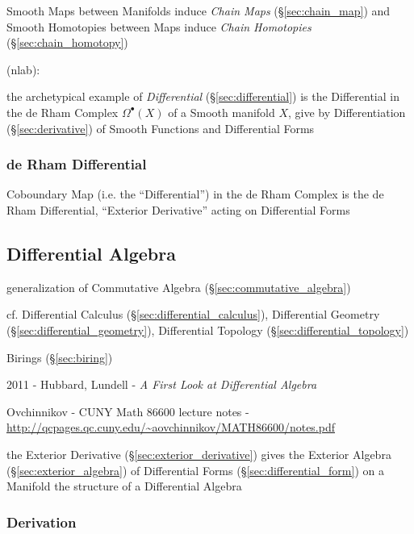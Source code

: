 Smooth Maps between Manifolds induce \emph{Chain Maps} (\S\ref{sec:chain_map})
and Smooth Homotopies between Maps induce \emph{Chain Homotopies}
(\S\ref{sec:chain_homotopy})


(nlab):

the archetypical example of \emph{Differential} (\S\ref{sec:differential}) is
the Differential in the de Rham Complex $\Omega^\bullet(X)$ of a Smooth manifold
$X$, give by Differentiation (\S\ref{sec:derivative}) of Smooth Functions and
Differential Forms



\subsubsection{de Rham Differential}\label{sec:derham_differential}

Coboundary Map (i.e. the ``Differential'') in the de Rham Complex is the de Rham
Differential, ``Exterior Derivative'' acting on Differential Forms



\subsection{Differential Algebra}\label{sec:differential_algebra}

generalization of Commutative Algebra (\S\ref{sec:commutative_algebra})

cf. Differential Calculus (\S\ref{sec:differential_calculus}), Differential
Geometry (\S\ref{sec:differential_geometry}), Differential Topology
(\S\ref{sec:differential_topology})

Birings (\S\ref{sec:biring})

2011 - Hubbard, Lundell - \emph{A First Look at Differential Algebra}

Ovchinnikov - CUNY Math 86600 lecture notes -
\url{http://qcpages.qc.cuny.edu/~aovchinnikov/MATH86600/notes.pdf}

the Exterior Derivative (\S\ref{sec:exterior_derivative}) gives the Exterior
Algebra (\S\ref{sec:exterior_algebra}) of Differential Forms
(\S\ref{sec:differential_form}) on a Manifold the structure of a Differential
Algebra



\subsubsection{Derivation}\label{sec:derivation}

